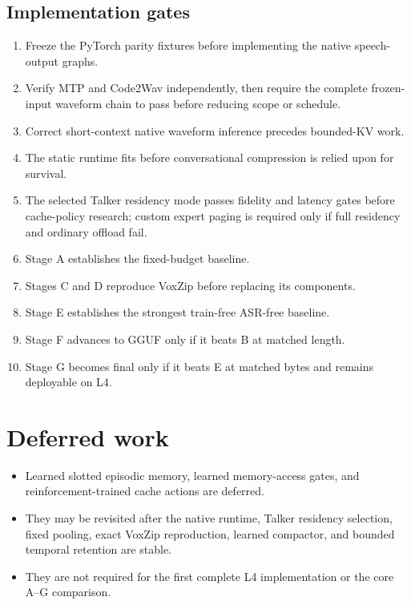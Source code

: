 \documentclass[10pt,letterpaper]{article}
\begin{document}
\subsection{Implementation gates}
\begin{enumerate}
    \item Freeze the PyTorch parity fixtures before implementing the native speech-output graphs.
    \item Verify MTP and Code2Wav independently, then require the complete frozen-input waveform chain to pass before reducing scope or schedule.
    \item Correct short-context native waveform inference precedes bounded-KV work.
    \item The static runtime fits before conversational compression is relied upon for survival.
    \item The selected Talker residency mode passes fidelity and latency gates before cache-policy research; custom expert paging is required only if full residency and ordinary offload fail.
    \item Stage A establishes the fixed-budget baseline.
    \item Stages C and D reproduce VoxZip before replacing its components.
    \item Stage E establishes the strongest train-free ASR-free baseline.
    \item Stage F advances to GGUF only if it beats B at matched length.
    \item Stage G becomes final only if it beats E at matched bytes and remains deployable on L4.
\end{enumerate}

\section{Deferred work}
\begin{itemize}
    \item Learned slotted episodic memory, learned memory-access gates, and reinforcement-trained cache actions are deferred.
    \item They may be revisited after the native runtime, Talker residency selection, fixed pooling, exact VoxZip reproduction, learned compactor, and bounded temporal retention are stable.
    \item They are not required for the first complete L4 implementation or the core A--G comparison.
\end{itemize}
\end{document}
